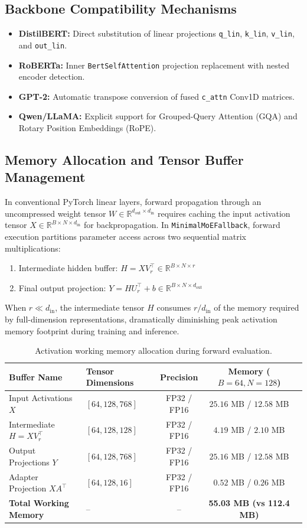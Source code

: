 \subsection{Backbone Compatibility Mechanisms}
\begin{itemize}
\item \textbf{DistilBERT:} Direct substitution of linear projections \texttt{q\_lin}, \texttt{k\_lin}, \texttt{v\_lin}, and \texttt{out\_lin}.
\item \textbf{RoBERTa:} Inner \texttt{BertSelfAttention} projection replacement with nested encoder detection.
\item \textbf{GPT-2:} Automatic transpose conversion of fused \texttt{c\_attn} Conv1D matrices.
\item \textbf{Qwen/LLaMA:} Explicit support for Grouped-Query Attention (GQA) and Rotary Position Embeddings (RoPE).
\end{itemize}

\subsection{Memory Allocation and Tensor Buffer Management}
In conventional PyTorch linear layers, forward propagation through an uncompressed weight tensor $W \in \mathbb{R}^{d_{\text{out}} \times d_{\text{in}}}$ requires caching the input activation tensor $X \in \mathbb{R}^{B \times N \times d_{\text{in}}}$ for backpropagation. In \texttt{MinimalMoEFallback}, forward execution partitions parameter access across two sequential matrix multiplications:
\begin{enumerate}
\item Intermediate hidden buffer: $H = X V_r^\top \in \mathbb{R}^{B \times N \times r}$
\item Final output projection: $Y = H U_r^\top + b \in \mathbb{R}^{B \times N \times d_{\text{out}}}$
\end{enumerate}
When $r \ll d_{\text{in}}$, the intermediate tensor $H$ consumes $r / d_{\text{in}}$ of the memory required by full-dimension representations, dramatically diminishing peak activation memory footprint during training and inference.

\begin{table}[H]
\centering
\small
\begin{tabular}{llccc}
\toprule
\textbf{Buffer Name} & \textbf{Tensor Dimensions} & \textbf{Precision} & \textbf{Memory ($B=64, N=128$)} \\
\midrule
Input Activations $X$ & $[64, 128, 768]$ & FP32 / FP16 & $25.16$ MB / $12.58$ MB \\
Intermediate $H = X V_r^\top$ & $[64, 128, 128]$ & FP32 / FP16 & $4.19$ MB / $2.10$ MB \\
Output Projections $Y$ & $[64, 128, 768]$ & FP32 / FP16 & $25.16$ MB / $12.58$ MB \\
Adapter Projection $X A^\top$ & $[64, 128, 16]$ & FP32 / FP16 & $0.52$ MB / $0.26$ MB \\
\midrule
\textbf{Total Working Memory} & -- & -- & \textbf{55.03 MB (vs 112.4 MB)} \\
\bottomrule
\end{tabular}
\caption{Activation working memory allocation during forward evaluation.}
\end{table}
